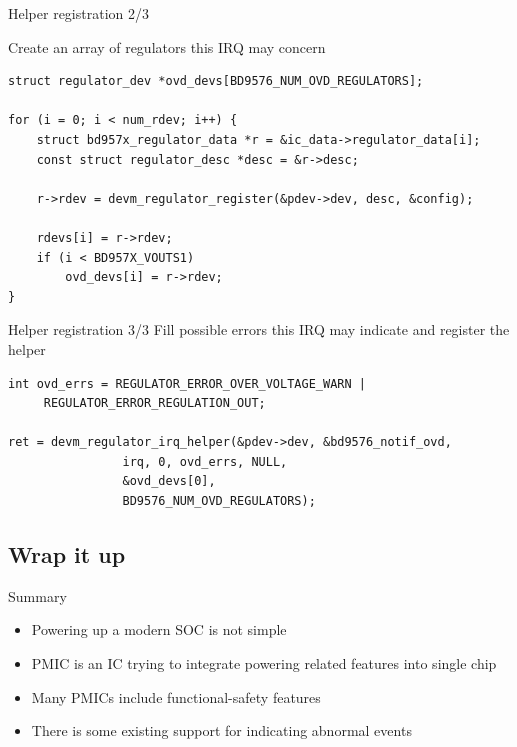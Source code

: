 \documentclass[10pt]{beamer}
\begin{document}
\begin{frame}[fragile, t]{Helper registration 2/3}\vspace{4pt}


\lstset{language=C}

\large Create an array of regulators this IRQ may concern
\vfill
{}

\scriptsize

\begin{lstlisting}
struct regulator_dev *ovd_devs[BD9576_NUM_OVD_REGULATORS];

for (i = 0; i < num_rdev; i++) {
	struct bd957x_regulator_data *r = &ic_data->regulator_data[i];
	const struct regulator_desc *desc = &r->desc;

	r->rdev = devm_regulator_register(&pdev->dev, desc, &config);

	rdevs[i] = r->rdev;
	if (i < BD957X_VOUTS1)
		ovd_devs[i] = r->rdev;
}
\end{lstlisting}
\end{frame}

\begin{frame}[fragile, t]{Helper registration 3/3}\vspace{4pt}
Fill possible errors this IRQ may indicate and register the helper
\vfill
{}
\scriptsize

\begin{lstlisting}
int ovd_errs = REGULATOR_ERROR_OVER_VOLTAGE_WARN |
	 REGULATOR_ERROR_REGULATION_OUT;

ret = devm_regulator_irq_helper(&pdev->dev, &bd9576_notif_ovd,
				irq, 0, ovd_errs, NULL,
				&ovd_devs[0],
				BD9576_NUM_OVD_REGULATORS);

\end{lstlisting}
\end{frame}


\addtocounter{framenumber}{-1}
\begin{frame}[plain]
\section{Wrap it up}
\end{frame}

\begin{frame}{Summary}
\begin{itemize}
	\item Powering up a modern SOC is not simple
	\item PMIC is an IC trying to integrate powering related features into single chip
	\item Many PMICs include functional-safety features
	\item There is some existing support for indicating abnormal events
\end{itemize}
\end{frame}
\end{document}
